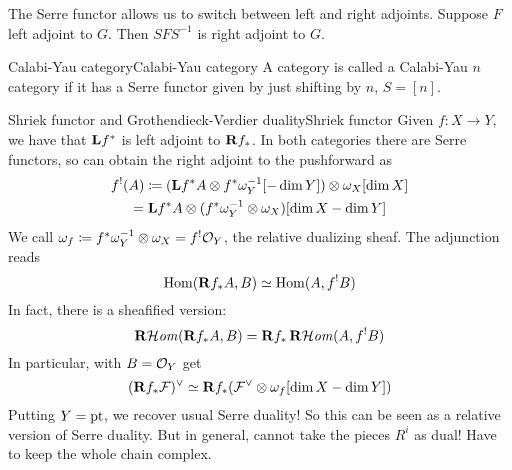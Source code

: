 

The Serre functor allows us to switch between left and right adjoints. Suppose $F$ left adjoint to $G$. Then $SFS^{-1}$ is right adjoint to $G$.


\begin{definition}{Calabi-Yau category}{Calabi-Yau category}
    A category is called a Calabi-Yau $n$ category if it has a Serre functor given by just shifting by $n$, $S=[n]$.
\end{definition}

\begin{example}{Shriek functor and Grothendieck-Verdier duality}{Shriek functor}
Given $f:X\to Y$, we have that $\mathbf{L} f^*$ is left adjoint to $\mathbf{R} f_*$. In both categories there are Serre functors, so can obtain the right adjoint to the pushforward as
\begin{gather*}
    f^!(A) \coloneqq (\mathbf{L} f^*A\otimes f^*\omega_Y^{-1}[-\dim Y])
            \otimes \omega_X[\dim X] \\
        = \mathbf{L} f^*A\otimes(f^*\omega_Y^{-1}\otimes\omega_X)[\dim X -\dim Y]
\end{gather*}
We call $\omega_f\coloneqq f^*\omega_Y^{-1}\otimes\omega_X=f^!\mathcal{O}_Y$, the relative dualizing sheaf. The adjunction reads
\begin{equation*}
    \operatorname{Hom}(\mathbf{R} f_*A,B)\simeq \operatorname{Hom}(A,f^!B)
\end{equation*}
In fact, there is a sheafified version:
\begin{equation*}
    \operatorname{\mathbf{R}\mathcal{H}\mathit{om}}(\mathbf{R} f_*A,B)=\mathbf{R} f_*\operatorname{\mathbf{R}\mathcal{H}\mathit{om}}(A,f^!B)
\end{equation*}
In particular, with $B=\mathcal{O}_Y$ get
\begin{equation*}
    (\mathbf{R} f_*\mathcal{F})^\vee
        \simeq \mathbf{R} f_*(\mathcal{F}^\vee\otimes\omega_f[\dim X-\dim Y])
\end{equation*}
Putting $Y=\mathrm{pt}$, we recover usual Serre duality! So this can be seen as a relative version of Serre duality. But in general, cannot take the pieces $R^i$ as dual! Have to keep the whole chain complex.
\end{example}


